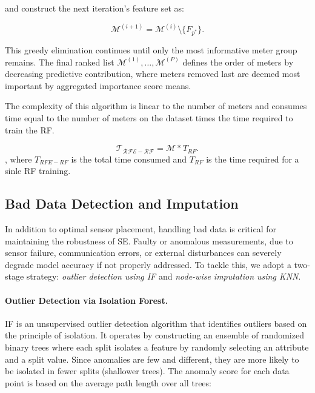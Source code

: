 \documentclass[journal]{IEEEtran}  %
\begin{document}
and construct the next iteration's feature set as:

\begin{equation}
\label{Feature set reduction}
\mathcal{M}^{(i+1)} = \mathcal{M}^{(i)} \setminus \{F_{p^*}\}.
\end{equation}


This greedy elimination continues until only the most informative meter group remains. The final ranked list \(\mathcal{M}^{(1)}, \ldots, \mathcal{M}^{(P)}\) defines the order of meters by decreasing predictive contribution, where meters removed last are deemed most important by aggregated importance score means.

The complexity of this algorithm is linear to the number of meters and consumes time equal to the number of meters on the dataset times the time required to train the RF.

\begin{equation}
\label{RF time}
\mathcal{T_{RFE-RF}} = \mathcal{M} * {T_{RF}}.
\end{equation}, where $T_{RFE-RF}$ is the total time consumed and $T_{RF}$ is the time required for a sinle RF training.



\subsection{Bad Data Detection and Imputation}

In addition to optimal sensor placement, handling bad data is critical for maintaining the robustness of SE. Faulty or anomalous measurements, due to sensor failure, communication errors, or external disturbances can severely degrade model accuracy if not properly addressed. To tackle this, we adopt a two-stage strategy: \textit{outlier detection using IF} and \textit{node-wise imputation using KNN}.

\paragraph{Outlier Detection via Isolation Forest.}
IF is an unsupervised outlier detection algorithm that identifies outliers based on the principle of isolation. It operates by constructing an ensemble of randomized binary trees where each split isolates a feature by randomly selecting an attribute and a split value. Since anomalies are few and different, they are more likely to be isolated in fewer splits (shallower trees). The anomaly score for each data point is based on the average path length over all trees:
\end{document}
